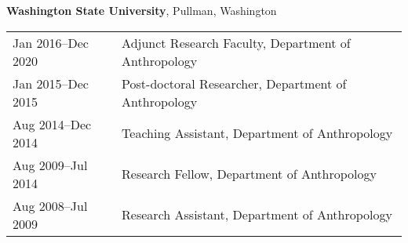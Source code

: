 {\bf Washington State University}, Pullman, Washington
\begin{list1}
\item[]
\begin{tabular}{@{}p{1.25in}p{4in}}
Jan 2016–Dec 2020   & Adjunct Research Faculty, Department of Anthropology \\
Jan 2015–Dec 2015  & Post-doctoral Researcher, Department of Anthropology \\            
Aug 2014–Dec 2014  & Teaching Assistant, Department of Anthropology \\        
Aug 2009–Jul 2014  & Research Fellow, Department of Anthropology \\
Aug 2008–Jul 2009  & Research Assistant, Department of Anthropology \\
\end{tabular}
\end{list1}

